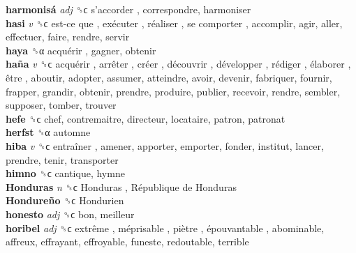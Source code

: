 \textbf{harmonisá} \emph{adj}  ␝ϲ   s’accorder , correspondre, harmoniser  \\
\textbf{hasi} \emph{v}  ␝ϲ   est-ce que ,  exécuter ,  réaliser ,  se comporter , accomplir, agir, aller, effectuer, faire, rendre, servir  \\
\textbf{haya} ␝α   acquérir , gagner, obtenir  \\
\textbf{haña} \emph{v}  ␝ϲ   acquérir ,  arrêter ,  créer ,  découvrir ,  développer ,  rédiger ,  élaborer ,  être , aboutir, adopter, assumer, atteindre, avoir, devenir, fabriquer, fournir, frapper, grandir, obtenir, prendre, produire, publier, recevoir, rendre, sembler, supposer, tomber, trouver  \\
\textbf{hefe} ␝ϲ  chef, contremaitre, directeur, locataire, patron, patronat  \\
\textbf{herfst} ␝α  automne  \\
\textbf{hiba} \emph{v}  ␝ϲ   entraîner , amener, apporter, emporter, fonder, institut, lancer, prendre, tenir, transporter  \\
\textbf{himno} ␝ϲ  cantique, hymne  \\
\textbf{Honduras} \emph{n}  ␝ϲ   Honduras ,  République de Honduras   \\
\textbf{Hondureño} ␝ϲ   Hondurien   \\
\textbf{honesto} \emph{adj}  ␝ϲ  bon, meilleur  \\
\textbf{horibel} \emph{adj}  ␝ϲ   extrême ,  méprisable ,  piètre ,  épouvantable , abominable, affreux, effrayant, effroyable, funeste, redoutable, terrible  \\
